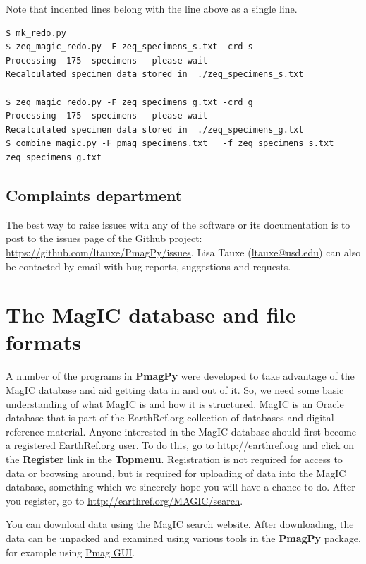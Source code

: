 \documentclass[11pt]{book}
\begin{document}
{Note that indented lines belong with the line above as a single line.

\begin{verbatim}
$ mk_redo.py
$ zeq_magic_redo.py -F zeq_specimens_s.txt -crd s
Processing  175  specimens - please wait
Recalculated specimen data stored in  ./zeq_specimens_s.txt

$ zeq_magic_redo.py -F zeq_specimens_g.txt -crd g
Processing  175  specimens - please wait
Recalculated specimen data stored in  ./zeq_specimens_g.txt
$ combine_magic.py -F pmag_specimens.txt   -f zeq_specimens_s.txt zeq_specimens_g.txt
\end{verbatim}

%
\section{Complaints department}

The best way to raise issues with any of the software or its documentation is to post to the issues page of the Github project: \url{https://github.com/ltauxe/PmagPy/issues}. Lisa Tauxe (\href{mailto:ltauxe@ucsd.edu}{ltauxe@usd.edu}) can also be contacted by email with bug reports, suggestions and requests.

\chapter{The MagIC database and file formats}

A number of the programs in {\bf PmagPy} were  developed to take advantage of the MagIC database and aid getting data in and out of it.   So, we need some basic understanding of what MagIC is and how it is structured.
MagIC  is an Oracle  database that is part of the EarthRef.org collection of databases and digital reference material.
Anyone interested in the MagIC database should first become a registered EarthRef.org user.  To do this, go to \url{http://earthref.org} and click on the {\bf Register} link in the {\bf Topmenu}.   Registration is not required for access to data or browsing around, but is required for uploading of data into the MagIC database, something which we sincerely hope you will have a chance to do.
After you register, go to \url{http://earthref.org/MAGIC/search}.


You can \href{#magic_download}{download data} using the \href{http://earthref.org/MAGIC/search}{MagIC search} website.
%
%
%
       After downloading, the data can be unpacked and examined using various tools in the {\bf PmagPy}  package, for example using \href{#pmag_gui.py}{Pmag GUI}.

}
\end{document}
